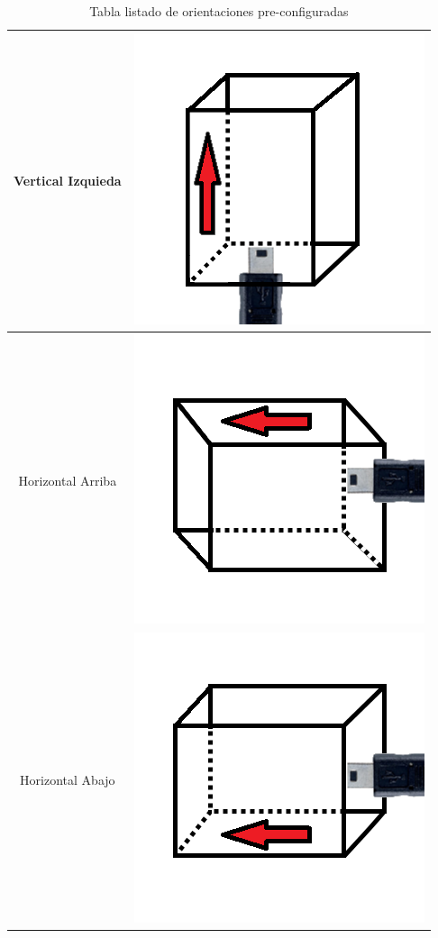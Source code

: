 \documentclass[12pt,a4paper]{article}
\begin{document}
\begin{table}[H]
\begin{tabular}{|c|c|}
		\hline 
		Vertical Izquieda & \includegraphics[scale=0.2]{images/IMU/verticalizquierda}   \\ 
		\hline 
		Horizontal Arriba &  \includegraphics[scale=0.2]{images/IMU/horizontalarriba}   \\ 
		\hline 
		Horizontal Abajo &  \includegraphics[scale=0.2]{images/IMU/horizontalabajo}   \\ 
		\hline 
	\end{tabular}
	\caption{Tabla listado de orientaciones pre-configuradas}
	\label{table:listadoOrientaciones}
\end{table}
\end{document}
